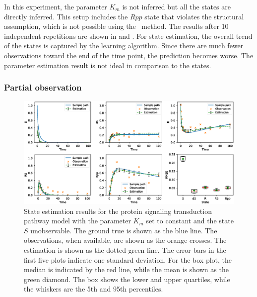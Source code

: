 In this experiment, the parameter $K_m$ is not inferred but all the states are directly inferred.
This setup includes the $Rpp$ state that violates the structural assumption, which is not possible using the \algovgmgp\ method.
The results after 10 independent repetitions are shown in  and .
For state estimation, the overall trend of the states is captured by the learning algorithm.
Since there are much fewer observations toward the end of the time point, the prediction becomes worse.
The parameter estimation result is not ideal in comparison to the states.

\subsubsection*{Partial observation}

\begin{figure}
    \centering
    \includegraphics[width=\textwidth]{graphics/protein-states-without-km-partial}
    \caption{State estimation results for the protein signaling transduction pathway model with the parameter $K_m$ set to constant and the state $S$ unobservable. The ground true is shown as the blue line. The observations, when available, are shown as the orange crosses. The estimation is shown as the dotted green line. The error bars in the first five plots indicate one standard deviation. For the box plot, the median is indicated by the red line, while the mean is shown as the green diamond. The box shows the lower and upper quartiles, while the whiskers are the 5th and 95th percentiles.}
    \label{fig-protein-states-partial-without-km}
\end{figure}

